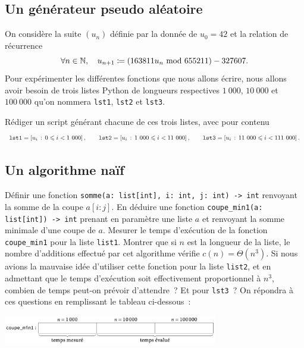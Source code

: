 \documentclass{magnolia}
\begin{document}
\subsection{Un générateur pseudo aléatoire}
On considère la suite $(u_n)$ définie par la donnée de $u_0=42$ et la relation de récurrence
\[\forall n\in\mathbb{N},\quad u_{n+1}\coloneqq \left(163811 u_n \ {\rm mod}\  655211\right) - 327607.\]
Pour expérimenter les différentes fonctions que nous allons écrire, nous allons avoir besoin de trois listes
Python de longueurs respectives $1\ 000$, $10\ 000$ et $100\ 000$ qu'on nommera \verb!lst1!, \verb!lst2!
et \verb !lst3!.
\begin{questions}
\question Rédiger un script générant chacune de ces trois listes, avec pour contenu
  \[\verb!lst1!=\left[u_i\,:\,0\leq i< 1\ 000\right], \qquad
    \verb!lst2!=\left[u_i\,:\,1\ 000\leq i< 11\ 000\right], \qquad 
    \verb!lst3!=\left[u_i\,:\,11\ 000\leq i< 111\ 000\right].\]
\end{questions}

\subsection{Un algorithme naïf}

\begin{questions}
\question Définir une fonction \verb!somme(a: list[int], i: int, j: int) -> int! renvoyant la somme de
  la coupe $a[i:j]$.
\question En déduire une fonction \verb!coupe_min1(a: list[int]) -> int! prenant en paramètre une liste $a$
  et renvoyant la somme minimale d'une coupe de $a$.
\question Mesurer le temps d'exécution de la fonction \verb!coupe_min1! pour la liste \verb!list1!.
\question Montrer que si $n$ est la longueur de la liste, le nombre d'additions effectué par cet algorithme
  vérifie $c(n)=\Theta(n^3)$.
\question Si nous avions la mauvaise idée d'utiliser cette fonction pour la liste \verb!list2!, et en
  admettant que le temps d'exécution soit effectivement proportionnel à $n^3$, combien de temps peut-on
  prévoir d'attendre~? Et pour \verb!lst3!~? On répondra à ces questions en remplissant le tableau
  ci-dessous~:
  \begin{center}
  \includegraphics[width=0.7\textwidth]{../../Commun/Images/python-tp-coupe-1}
  \end{center} 
\end{questions}
\end{document}
